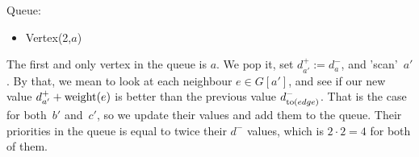 \begin{minipage}{.75\linewidth}
\end{minipage}\hfill%
\begin{minipage}{.22\linewidth}
    Queue:
    \begin{itemize}
        \item Vertex(2,$a$)
    \end{itemize}
\end{minipage}

The first and only vertex in the queue is $a$. We pop it, set $d^+_{a'} := d^-_a$, and 'scan'~$a'$. By that, we mean to look at each neighbour $e \in G[a']$, and see if our new value $d^+_{a'} + \operatorname{weight}(e)$ is better than the previous value $d^-_{\operatorname{to}(edge)}$. That is the case for both~$b'$ and~$c'$, so we update their values and add them to the queue. Their priorities in the queue is equal to twice their $d^-$ values, which is $2 \cdot 2 = 4$ for both of them.

